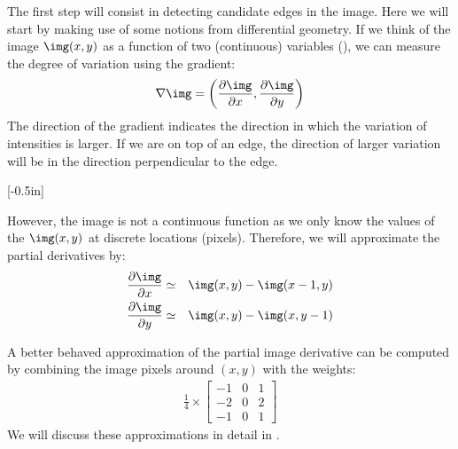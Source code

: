 The first step will consist in detecting candidate edges in the image.
Here we will start by making use of some notions from differential geometry. If we think of the image $\img (x,y)$ as a function of two (continuous) variables (\fig{\ref{fig:imageAsSurface}}), we can measure the degree of variation using the gradient:
\begin{eqnarray}
\nabla \img = \left( \frac{\partial \img}{\partial x}, \frac{\partial \img}{\partial y} \right)
\end{eqnarray}
The direction of the gradient indicates the direction in which the variation of intensities is larger. If we are on top of an edge, the direction of larger variation will be in the direction perpendicular to the edge. 

[-0.5in]

However, the image is not a continuous function as we only know the values of the $\img (x,y)$ at discrete locations (pixels). Therefore, we will approximate the partial derivatives by:
\begin{eqnarray}
\frac{\partial \img}{\partial x} & \simeq & \img(x,y) - \img(x-1,y) \\
\frac{\partial \img}{\partial y} & \simeq & \img(x,y) - \img(x,y-1) 
\label{eq:image_partial_derivatives_aprox}
\end{eqnarray}

A better behaved approximation of the partial image derivative can be computed by combining the image pixels around $(x,y)$ with the weights:
\begin{eqnarray}
\frac{1}{4} \times
\left [
\begin{matrix}
-1 & 0 & 1 \\
-2 & 0 & 2 \\
-1 & 0 & 1 
\end{matrix}
\right ] \nonumber
\end{eqnarray}
We will discuss these approximations in detail in \chap{\ref{chapter:image_derivatives}}. 

